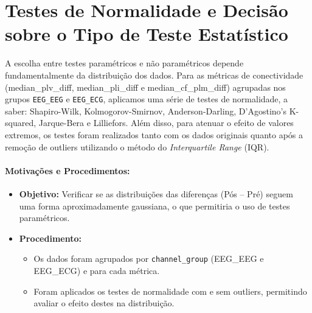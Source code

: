 \section{Testes de Normalidade e Decisão sobre o Tipo de Teste Estatístico}
A escolha entre testes paramétricos e não paramétricos depende fundamentalmente da distribuição dos dados. Para as métricas de conectividade (median\_plv\_diff, median\_pli\_diff e median\_cf\_plm\_diff) agrupadas nos grupos \texttt{EEG\_EEG} e \texttt{EEG\_ECG}, aplicamos uma série de testes de normalidade, a saber: Shapiro-Wilk, Kolmogorov-Smirnov, Anderson-Darling, D'Agostino's K-squared, Jarque-Bera e Lilliefors. Além disso, para atenuar o efeito de valores extremos, os testes foram realizados tanto com os dados originais quanto após a remoção de outliers utilizando o método do \emph{Interquartile Range} (IQR).

\paragraph{Motivações e Procedimentos:}
\begin{itemize}
    \item \textbf{Objetivo:} Verificar se as distribuições das diferenças (Pós -- Pré) seguem uma forma aproximadamente gaussiana, o que permitiria o uso de testes paramétricos.
    \item \textbf{Procedimento:} 
    \begin{itemize}
        \item Os dados foram agrupados por \texttt{channel\_group} (EEG\_EEG e EEG\_ECG) e para cada métrica.
        \item Foram aplicados os testes de normalidade com e sem outliers, permitindo avaliar o efeito destes na distribuição.
    \end{itemize}
\end{itemize}

